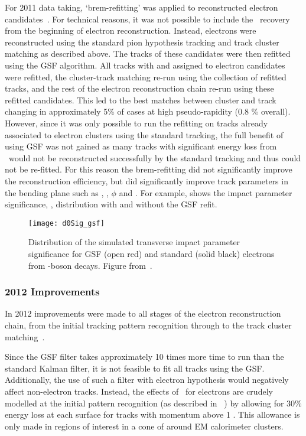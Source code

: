 For 2011 data taking, `brem-refitting' was applied to
reconstructed electron candidates~\cite{ATLAS-CONF-2012-047}. For technical reasons, it was not possible to
include the \brem\ recovery from the beginning of electron reconstruction.
Instead, electrons were reconstructed using the standard pion hypothesis
tracking and track cluster matching as described above. The tracks of these candidates were then refitted
using the GSF algorithm. All tracks with  and  assigned to
electron candidates were refitted, the cluster-track matching re-run
using the collection of refitted tracks, and the rest of the electron reconstruction
chain re-run using these refitted candidates. This led to the best matches between
cluster and track changing in approximately 5\% of cases at high pseudo-rapidity (0.8 \%
overall). However, since it was only possible to run the refitting on tracks
already associated to electron clusters using the standard tracking, the full
benefit of using GSF was not gained as many tracks with significant energy loss
from \brem\ would not be reconstructed successfully by the standard tracking and
thus could not be re-fitted. For this reason the brem-refitting did not
significantly improve the reconstruction efficiency, but did significantly
improve track parameters in the bending plane such as \dzero, \dzerosig,
$\phi$ and \qoverp. For example,  shows the impact parameter
significance, \dzerosig, distribution with and without the GSF refit. 

\begin{figure}[h]
\centering
            \texttt{[image: d0Sig\_gsf]}
\caption{
Distribution of the simulated transverse impact parameter significance for GSF (open
red) and standard (solid black) electrons from \Z-boson decays. 
Figure from~\cite{ATLAS-CONF-2012-047}.}
\label{fig:d0Sig-gsf}
\end{figure}

\subsubsection{2012 Improvements}

In 2012 improvements were made to all stages of the electron reconstruction
chain, from the initial tracking pattern recognition through to the track
cluster matching~\cite{HSG2:1456228}. 

Since the GSF filter takes approximately 10 times more time to
run than the standard Kalman filter, it is not feasible to fit all tracks using
the GSF. Additionally, the use of such a filter with electron hypothesis would
negatively affect non-electron tracks. Instead, the effects of \brem\ for
electrons are crudely modelled at the initial pattern recognition (as described
in ~) by allowing for 30\% energy loss at each surface for tracks with
momentum above 1 \gev. This allowance is only made in regions of interest in a
cone of  around EM calorimeter clusters. 

